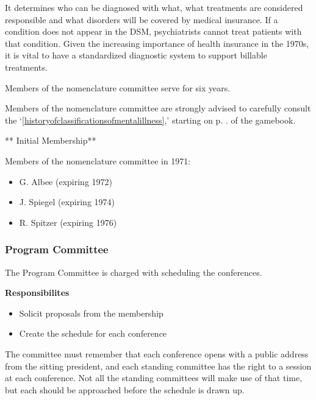 \begin{refsection}
It determines who can be diagnosed with what, what treatments are considered responsible and what disorders will be covered by medical insurance. If a condition does not appear in the DSM, psychiatrists cannot treat patients with that condition. Given the increasing importance of health insurance in the 1970s, it is vital to have a standardized diagnostic system to support billable treatments.

Members of the nomenclature committee serve for six years.

Members of the nomenclature committee are strongly advised to carefully consult the `\ref{historyofclassificationsofmentalillness},' starting on p. \pageref{historyofclassificationsofmentalillness}. of the gamebook.

** Initial Membership**

Members of the nomenclature committee in 1971:

\begin{itemize}
\item G. Albee (expiring 1972)

\item J. Spiegel (expiring 1974)

\item R. Spitzer (expiring 1976)

\end{itemize}

\newpage

\subsubsection{Program Committee}
\label{programcommittee}

The Program Committee is charged with scheduling the conferences. 

\textbf{Responsibilites}

\begin{itemize}
\item Solicit proposals from the membership

\item Create the schedule for each conference

\end{itemize}

The committee must remember that each conference opens with a public address from the sitting president, and each standing committee has the right to a session at each conference. Not all the standing committees will make use of that time, but each should be approached before the schedule is drawn up.


\end{refsection}

